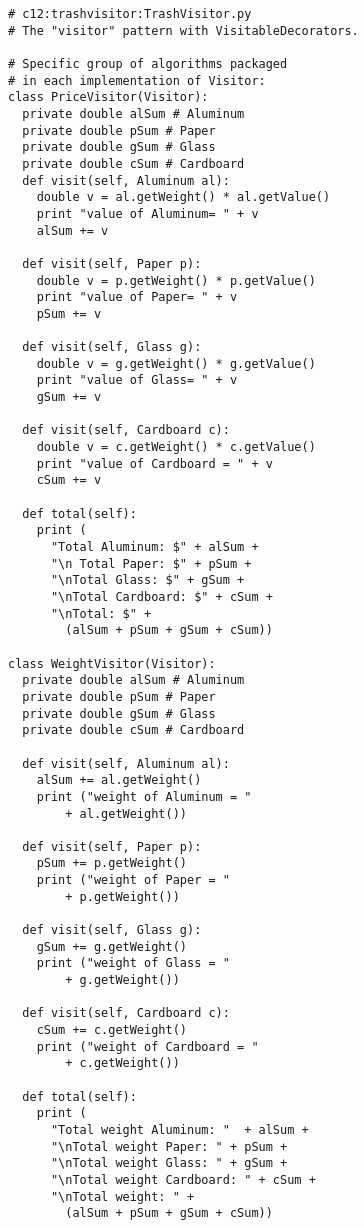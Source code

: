 \begin{lstlisting} 
# c12:trashvisitor:TrashVisitor.py  
# The "visitor" pattern with VisitableDecorators. 

# Specific group of algorithms packaged 
# in each implementation of Visitor: 
class PriceVisitor(Visitor): 
  private double alSum # Aluminum 
  private double pSum # Paper 
  private double gSum # Glass 
  private double cSum # Cardboard 
  def visit(self, Aluminum al): 
    double v = al.getWeight() * al.getValue() 
    print "value of Aluminum= " + v 
    alSum += v 
    
  def visit(self, Paper p): 
    double v = p.getWeight() * p.getValue() 
    print "value of Paper= " + v 
    pSum += v 
    
  def visit(self, Glass g): 
    double v = g.getWeight() * g.getValue() 
    print "value of Glass= " + v 
    gSum += v 
    
  def visit(self, Cardboard c): 
    double v = c.getWeight() * c.getValue() 
    print "value of Cardboard = " + v 
    cSum += v 
    
  def total(self): 
    print ( 
      "Total Aluminum: $" + alSum + 
      "\n Total Paper: $" + pSum +  
      "\nTotal Glass: $" + gSum +  
      "\nTotal Cardboard: $" + cSum + 
      "\nTotal: $" +  
        (alSum + pSum + gSum + cSum)) 
        
class WeightVisitor(Visitor): 
  private double alSum # Aluminum 
  private double pSum # Paper 
  private double gSum # Glass 
  private double cSum # Cardboard 
  
  def visit(self, Aluminum al): 
    alSum += al.getWeight() 
    print ("weight of Aluminum = " 
        + al.getWeight()) 
        
  def visit(self, Paper p): 
    pSum += p.getWeight() 
    print ("weight of Paper = " 
        + p.getWeight()) 
        
  def visit(self, Glass g): 
    gSum += g.getWeight() 
    print ("weight of Glass = " 
        + g.getWeight()) 
        
  def visit(self, Cardboard c): 
    cSum += c.getWeight() 
    print ("weight of Cardboard = " 
        + c.getWeight()) 
        
  def total(self): 
    print ( 
      "Total weight Aluminum: "  + alSum + 
      "\nTotal weight Paper: " + pSum + 
      "\nTotal weight Glass: " + gSum + 
      "\nTotal weight Cardboard: " + cSum + 
      "\nTotal weight: " +  
        (alSum + pSum + gSum + cSum))
        

\end{lstlisting}
